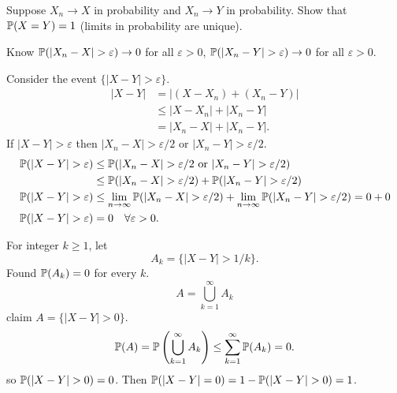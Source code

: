 \documentclass[10pt, a4paper]{article}
\begin{document}
\begin{problem}
    Suppose $X_n \to X$ in probability and $X_n \to Y$ in probability.
    Show that $\P(X = Y) = 1$
    (limits in probability are unique).

    \begin{solution}
        Know $\P(|X_n - X| > \varepsilon) \to 0$ for all $\varepsilon > 0$,
        $\P(|X_n - Y| > \varepsilon) \to 0$ for all $\varepsilon > 0$.

        Consider the event $\{|X - Y| > \varepsilon\}$.
        \begin{align*}
            |X - Y| &= |(X - X_n) + (X_n - Y)| \\
            &\leq |X - X_n| + |X_n - Y| \\
            &= |X_n - X| + |X_n - Y|.
        \end{align*}
        If $|X - Y| > \varepsilon$ then $|X_n - X| > \varepsilon / 2$ or $|X_n - Y| > \varepsilon / 2$.
        \begin{align*}
            \P(|X - Y| > \varepsilon) &\leq \P(|X_n - X| > \varepsilon / 2\text{ or }|X_n - Y| > \varepsilon / 2) \\
            &\leq \P(|X_n - X| > \varepsilon / 2) + \P(|X_n - Y| > \varepsilon / 2) \\
            \P(|X - Y| > \varepsilon) &\leq \lim_{n \to \infty}\P(|X_n - X| > \varepsilon / 2) + \lim_{n \to \infty}\P(|X_n - Y| > \varepsilon / 2) = 0 + 0 \\
            \P(|X - Y| > \varepsilon) &= 0\quad \forall \varepsilon > 0.
        \end{align*}

        For integer $k \geq 1$,
        let
        \[
        A_k = \{|X - Y| > 1 / k\}.
        \]
        Found $\P(A_k) = 0$ for every $k$.
        \[
        A = \bigcup_{k = 1}^{\infty}A_k
        \]
        claim $A = \{|X - Y| > 0\}$.
        \[
        \P(A) = \P\left(\bigcup_{k = 1}^{\infty}A_k\right) \leq \sum_{k = 1}^{\infty}\P(A_k) = 0.
        \]
        so $\P(|X - Y| > 0) = 0$.
        Then $\P(|X - Y| = 0) = 1 - \P(|X - Y| > 0) = 1$.
    \end{solution}
\end{problem}
\end{document}
